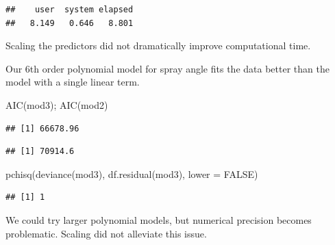 \documentclass[
  ignorenonframetext,
]{beamer}
\newenvironment{Shaded}{\begin{snugshade}}{\end{snugshade}}
\newcommand{\AttributeTok}[1]{\textcolor[rgb]{0.77,0.63,0.00}{#1}}
\newcommand{\ConstantTok}[1]{\textcolor[rgb]{0.00,0.00,0.00}{#1}}
\newcommand{\FunctionTok}[1]{\textcolor[rgb]{0.00,0.00,0.00}{#1}}
\newcommand{\NormalTok}[1]{#1}
\begin{document}
\begin{frame}[fragile]{}
\begin{verbatim}
##    user  system elapsed 
##   8.149   0.646   8.801
\end{verbatim}

\vspace{12pt}
\normalsize

Scaling the predictors did not dramatically improve computational time.
\end{frame}

\begin{frame}[fragile]{}
\protect\hypertarget{section-13}{}
Our 6th order polynomial model for spray angle fits the data better than
the model with a single linear term.

\vspace{12pt}
\tiny

\begin{Shaded}
\begin{Highlighting}[]
\FunctionTok{AIC}\NormalTok{(mod3); }\FunctionTok{AIC}\NormalTok{(mod2)}
\end{Highlighting}
\end{Shaded}

\begin{verbatim}
## [1] 66678.96
\end{verbatim}

\begin{verbatim}
## [1] 70914.6
\end{verbatim}

\begin{Shaded}
\begin{Highlighting}[]
\FunctionTok{pchisq}\NormalTok{(}\FunctionTok{deviance}\NormalTok{(mod3), }\FunctionTok{df.residual}\NormalTok{(mod3), }\AttributeTok{lower =} \ConstantTok{FALSE}\NormalTok{)}
\end{Highlighting}
\end{Shaded}

\begin{verbatim}
## [1] 1
\end{verbatim}

\vspace{12pt}
\normalsize

We could try larger polynomial models, but numerical precision becomes
problematic. Scaling did not alleviate this issue.
\end{frame}
\end{document}
